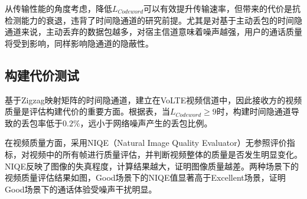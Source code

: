 从传输性能的角度考虑，降低$L_{Codeword}$可以有效提升传输速率，但带来的代价是抗检测能力的衰退，违背了时间隐通道的研究前提。尤其是对基于主动丢包的时间隐通道来说，主动丢弃的数据包越多，对宿主信道意味着噪声越强，用户的通话质量将受到影响，同样影响隐通道的隐蔽性。

\subsection{构建代价测试}
\label{chap:zigzag:results:cost}


基于Zigzag映射矩阵的时间隐通道，建立在VoLTE视频信道中，因此接收方的视频质量是评估构建代价的重要方面。根据表，当$L_{Codeword}\ge 9$时，构建时间隐通道导致的丢包率低于$0.2\%$，远小于网络噪声产生的丢包比例。

在视频质量方面，采用NIQE（Natural Image Quality Evaluator）无参照评价指标，对视频中的所有帧进行质量评估，并判断视频整体的质量是否发生明显变化。NIQE反映了图像的失真程度，计算结果越大，证明图像质量越差。两种场景下的视频质量评估结果如图，Good场景下的NIQE值显著高于Excellent场景，证明Good场景下的通话体验受噪声干扰明显。

